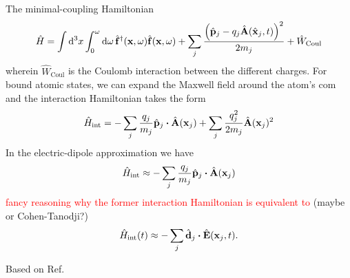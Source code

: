 The minimal-coupling Hamiltonian
\begin{equation}
	\hat{H}
	=
	\int\dd[3]{x}
	\int_0^\omega\dd{\omega}
	\hat{\vb{f}}^\dagger(\vb{x},\omega)
	\hat{\vb{f}}(\vb{x},\omega)
	+
	\sum_j\frac{\left(\hat{\vb{p}}_j-q_j\hat{\vb{A}}(\hat{\vb{x}}_j,t)\right)^2}{2m_j}
	+
	\hat{W}_\text{Coul}
\end{equation}
wherein $\hat{W}_\text{Coul}$ is the Coulomb interaction between the different charges.
For bound atomic states, we can expand the Maxwell field around the atom's \gls{com} and the interaction Hamiltonian takes the form
\begin{equation}
	\hat{H}_\text{int}
	=
	-
	\sum_j\frac{q_j}{m_j}
	\hat{\vb{p}}_j
	\vdot
	\hat{\vb{A}}(\vb{x}_j)
	+
	\sum_j\frac{q_j^2}{2m_j}
	\hat{\vb{A}}(\vb{x}_j)^2
\end{equation}
In the electric-dipole approximation we have
\begin{equation}
	\hat{H}_\text{int}
	\approx
	-
	\sum_j\frac{q_j}{m_j}
	\hat{\vb{p}}_j
	\vdot
	\hat{\vb{A}}(\vb{x}_j)	
\end{equation}
\textcolor{red}{fancy reasoning why the former interaction Hamiltonian is equivalent to} (maybe \cite[p.~691]{Mandel1995} or Cohen-Tanodji?)
\begin{equation}
	\hat{H}_\text{int}(t)
	\approx
	-
	\sum_j
	\hat{\vb{d}}_j
	\vdot
	\hat{\vb{E}}(\vb{x}_j,t)
	.
\end{equation}

Based on Ref.~\cite[p.~173]{Vogel2006}

